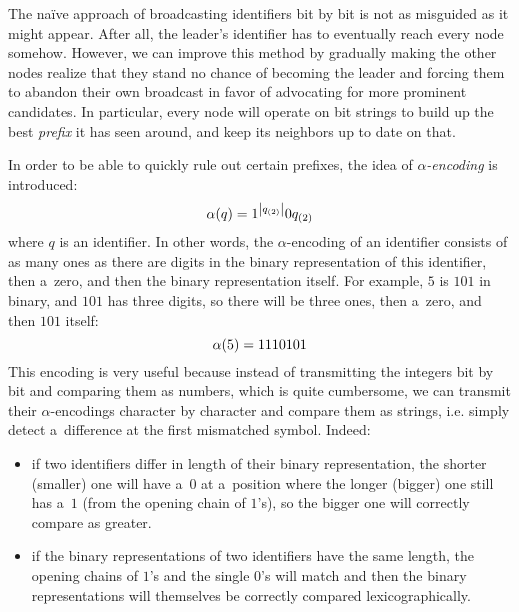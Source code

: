 \documentclass{article}
\DeclarePairedDelimiter{\parenthesesdelimiter}{(}{)}
\def\pars{\parenthesesdelimiter*}
\DeclarePairedDelimiter{\lendelimiter}{|}{|}
\def\len{\lendelimiter*}
\begin{document}
The naïve approach of broadcasting identifiers bit by bit is not as misguided as it might appear. After all, the leader's identifier has to eventually reach every node somehow. However, we can improve this method by gradually making the other nodes realize that they stand no chance of becoming the leader and forcing them to abandon their own broadcast in favor of advocating for more prominent candidates. In particular, every node will operate on bit strings to build up the best \emph{prefix} it has seen around, and keep its neighbors up to date on that.

In order to be able to quickly rule out certain prefixes, the idea of \emph{\(\alpha\)-encoding} is introduced:
\begin{equation*}
    \alpha\pars{q} = 1^{\len{q_{\pars{2}}}}0q_{\pars{2}}
\end{equation*}
where \(q\) is an identifier. In other words, the \(\alpha\)-encoding of an identifier consists of as many ones as there are digits in the binary representation of this identifier, then a~zero, and then the binary representation itself. For example, \(5\) is \(101\) in binary, and \(101\) has three digits, so there will be three ones, then a~zero, and then \(101\) itself:
\begin{equation*}
    \alpha\pars{5} = 1110101
\end{equation*}
This encoding is very useful because instead of transmitting the integers bit by bit and comparing them as numbers, which is quite cumbersome, we can transmit their \(\alpha\)-encodings character by character and compare them as strings, i.e. simply detect a~difference at the first mismatched symbol. Indeed:
\begin{itemize}
    \item if two identifiers differ in length of their binary representation, the shorter (smaller) one will have a~\(0\) at a~position where the longer (bigger) one still has a~\(1\) (from the opening chain of \(1\)'s), so the bigger one will correctly compare as greater.
    \item if the binary representations of two identifiers have the same length, the opening chains of \(1\)'s and the single \(0\)'s will match and then the binary representations will themselves be correctly compared lexicographically.
\end{itemize}
\end{document}
